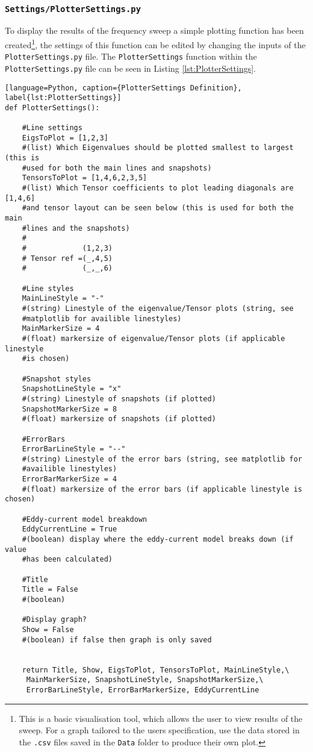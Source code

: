 \\
\subsubsection{\texttt{Settings/PlotterSettings.py}}\label{sectPlotterSettings.py}
To display the results of the frequency sweep a simple plotting function has been created\footnote{This is a basic visualisation tool, which allows the user to view results of the sweep. For a graph tailored to the users specification, use the data stored in the \texttt{.csv} files saved in the \texttt{Data} folder to produce their own plot.}, the settings of this function can be edited by changing the inputs of the \texttt{PlotterSettings.py} file. The \texttt{PlotterSettings} function within the \texttt{PlotterSettings.py} file can be seen in Listing \ref{lst:PlotterSettings}. 

\begin{lstlisting}[language=Python, caption={PlotterSettings Definition}, label{lst:PlotterSettings}]
def PlotterSettings():
    
    #Line settings
    EigsToPlot = [1,2,3]
    #(list) Which Eigenvalues should be plotted smallest to largest (this is
    #used for both the main lines and snapshots)
    TensorsToPlot = [1,4,6,2,3,5]
    #(list) Which Tensor coefficients to plot leading diagonals are [1,4,6]
    #and tensor layout can be seen below (this is used for both the main
    #lines and the snapshots) 
    #
    #             (1,2,3)
    # Tensor ref =(_,4,5)
    #             (_,_,6)
    
    #Line styles
    MainLineStyle = "-"
    #(string) Linestyle of the eigenvalue/Tensor plots (string, see
    #matplotlib for availible linestyles)
    MainMarkerSize = 4
    #(float) markersize of eigenvalue/Tensor plots (if applicable linestyle
    #is chosen)
    
    #Snapshot styles
    SnapshotLineStyle = "x"
    #(string) Linestyle of snapshots (if plotted)
    SnapshotMarkerSize = 8
    #(float) markersize of snapshots (if plotted)
    
    #ErrorBars
    ErrorBarLineStyle = "--"
    #(string) Linestyle of the error bars (string, see matplotlib for
    #availible linestyles)
    ErrorBarMarkerSize = 4
    #(float) markersize of the error bars (if applicable linestyle is chosen)
    
    #Eddy-current model breakdown
    EddyCurrentLine = True
    #(boolean) display where the eddy-current model breaks down (if value
    #has been calculated)
    
    #Title
    Title = False
    #(boolean)
    
    #Display graph?
    Show = False
    #(boolean) if false then graph is only saved
    
    
    return Title, Show, EigsToPlot, TensorsToPlot, MainLineStyle,\
     MainMarkerSize, SnapshotLineStyle, SnapshotMarkerSize,\
     ErrorBarLineStyle, ErrorBarMarkerSize, EddyCurrentLine

\end{lstlisting}

